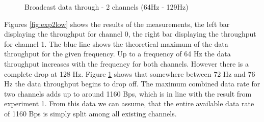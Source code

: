 \begin{description}
\begin{figure}[H]
		\caption{Broadcast data through - 2 channels (64Hz - 129Hz)}\label{fig:exp2high}
	\end{figure}
	Figures \ref{fig:exp2low} shows the results of the measurements, the left bar displaying the throughput for channel 0, the right bar displaying the throughput for channel 1. The blue line shows the theoretical maximum of the data throughput for the given frequency. Up to a frequency of 64 Hz the data throughput increases with the frequency for both channels. However there is a complete drop at 128 Hz. Figure \ref{fig:exp2high} shows that somewhere between 72 Hz and 76 Hz the data throughput begins to drop off. The maximum combined data rate for two channels adds up to around 1160 Bps, which is in line with the result from experiment 1. From this data we can assume, that the entire available data rate of 1160 Bps is simply split among all existing channels.
\end{description}
\newpage


